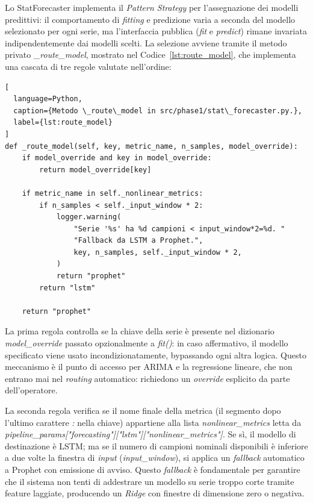 Lo StatForecaster implementa il \textit{Pattern Strategy} per l'assegnazione dei modelli
predittivi: il comportamento di \textit{fitting} e predizione varia a seconda del modello
selezionato per ogni serie, ma l'interfaccia pubblica (\textit{fit} e \textit{predict}) rimane
invariata indipendentemente dai modelli scelti. La selezione avviene tramite il metodo privato
\textit{\_route\_model}, mostrato nel Codice~\ref{lst:route_model}, che implementa una cascata
di tre regole valutate nell'ordine:

\begin{lstlisting}[
  language=Python,
  caption={Metodo \_route\_model in src/phase1/stat\_forecaster.py.},
  label={lst:route_model}
]
def _route_model(self, key, metric_name, n_samples, model_override):
    if model_override and key in model_override:
        return model_override[key]

    if metric_name in self._nonlinear_metrics:
        if n_samples < self._input_window * 2:
            logger.warning(
                "Serie '%s' ha %d campioni < input_window*2=%d. "
                "Fallback da LSTM a Prophet.",
                key, n_samples, self._input_window * 2,
            )
            return "prophet"
        return "lstm"

    return "prophet"
\end{lstlisting}

La prima regola controlla se la chiave della serie è presente nel dizionario
\textit{model\_override} passato opzionalmente a \textit{fit()}: in caso affermativo, il modello
specificato viene usato incondizionatamente, bypassando ogni altra logica. Questo meccanismo è il
punto di accesso per ARIMA e la regressione lineare, che non entrano mai nel \textit{routing}
automatico: richiedono un \textit{override} esplicito da parte dell'operatore.

La seconda regola verifica se il nome finale della metrica (il segmento dopo l'ultimo carattere
\textit{:} nella chiave) appartiene alla lista \textit{nonlinear\_metrics} letta da
\textit{pipeline\_params["forecasting"]["lstm"]["nonlinear\_metrics"]}. Se sì, il modello di
destinazione è LSTM; ma se il numero di campioni nominali disponibili è inferiore a due volte la
finestra di \textit{input} (\textit{input\_window}), si applica un \textit{fallback} automatico
a Prophet con emissione di avviso. Questo \textit{fallback} è fondamentale per garantire che il
sistema non tenti di addestrare un modello su serie troppo corte tramite feature laggiate, producendo
un \textit{Ridge} con finestre di dimensione zero o negativa.

